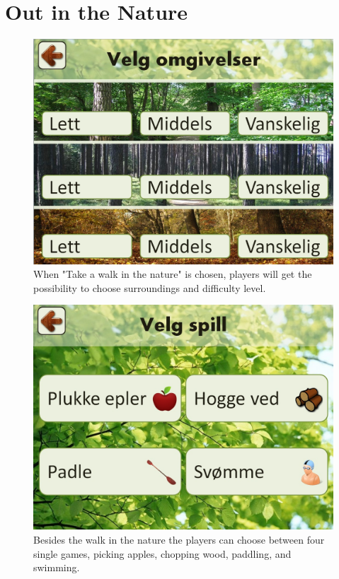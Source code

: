 \section{Out in the Nature}

\begin{figure} [ht!]
\centering
\includegraphics[scale=0.45]{VelgOmgivelser.jpg}
\caption[Choice of surroundings and difficulty]{When "Take a walk in the nature" is chosen, players will get the possibility to choose surroundings and difficulty level.}
\label{fig:omgivelseNivaa}
\end{figure}

\begin{figure} [ht!]
\centering
\includegraphics[scale=0.4]{VelgSpill.jpg}
\caption[The four single games]{Besides the walk in the nature the players can choose between four single games, picking apples, chopping wood, paddling, and swimming.}
\label{fig:velgSpill}
\end{figure}


